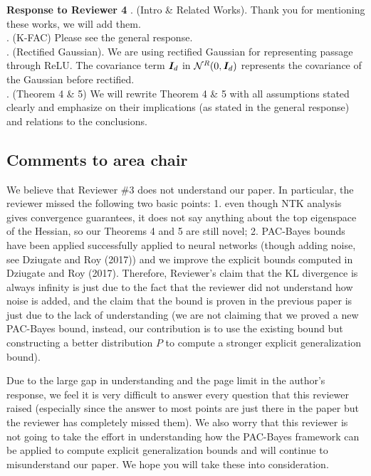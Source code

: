 \documentclass[12pt]{colt2022} %
\begin{document}
\vskip 1mm
\noindent
\textbf{Response to Reviewer 4}
\vskip 1mm
. (Intro \& Related Works). Thank you for mentioning these works, we will add them. \\%
. (K-FAC) Please see the general response. \\%
. (Rectified Gaussian). We are using rectified Gaussian for representing passage through ReLU. The covariance term ${\bm{I}}_d$ in ${\mathcal{N}}^{\emph{R}}(0,{\bm{I}}_d)$ represents the covariance of the Gaussian before rectified.\\
. (Theorem 4 \& 5) We will rewrite Theorem 4 \& 5 with all assumptions stated clearly and emphasize on their implications (as stated in the general response) and relations to the conclusions.
\newpage

\subsection*{Comments to area chair}
We believe that Reviewer \#3 does not understand our paper. In particular, the reviewer missed the following two basic points: 1. even though NTK analysis gives convergence guarantees, it does not say anything about the top eigenspace of the Hessian, so our Theorems 4 and 5 are still novel; 2. PAC-Bayes bounds have been applied successfully applied to neural networks (though adding noise, see Dziugate and Roy (2017)) and we improve the explicit bounds computed in Dziugate and Roy (2017). Therefore, Reviewer's claim that the KL divergence is always infinity is just due to the fact that the reviewer did not understand how noise is added, and the claim that the bound is proven in the previous paper is just due to the lack of understanding (we are not claiming that we proved a new PAC-Bayes bound, instead, our contribution is to use the existing bound but constructing a better distribution $P$ to compute a stronger explicit generalization bound). 

Due to the large gap in understanding and the page limit in the author's response, we feel it is very difficult to answer every question that this reviewer raised (especially since the answer to most points are just there in the paper but the reviewer has completely missed them). We also worry that this reviewer is not going to take the effort in understanding how the PAC-Bayes framework can be applied to compute explicit generalization bounds and will continue to misunderstand our paper. We hope you will take these into consideration.
\end{document}
